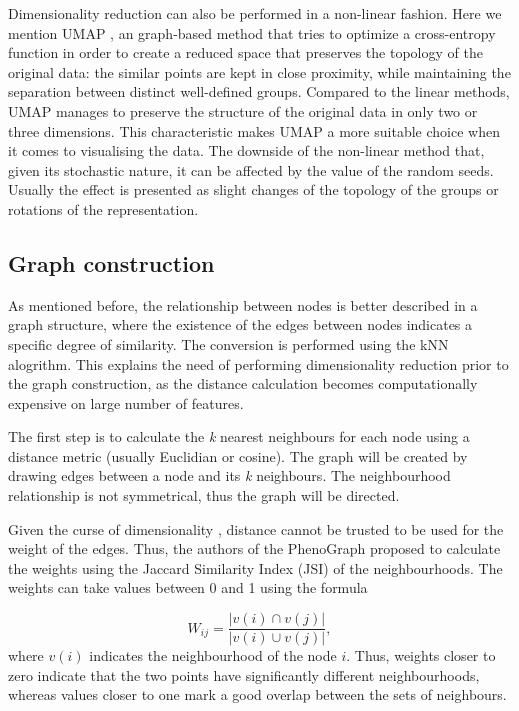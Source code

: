     Dimensionality reduction can also be performed in a non-linear fashion. Here we mention UMAP \cite{mcinnes2018uniform}, an graph-based method that tries to optimize a cross-entropy function in order to create a reduced space that preserves the topology of the original data: the similar points are kept in close proximity, while maintaining the separation between distinct well-defined groups. Compared to the linear methods, UMAP manages to preserve the structure of the original data in only two or three dimensions. This characteristic makes UMAP a more suitable choice when it comes to visualising the data. The downside of the non-linear method that, given its stochastic nature, it can be affected by the value of the random seeds. Usually the effect is presented as slight changes of the topology of the groups or rotations of the representation.

    \subsection{Graph construction}
    As mentioned before, the relationship between nodes is better described in a graph structure, where the existence of the edges between nodes indicates a specific degree of similarity. The conversion is performed using the kNN alogrithm. This explains the need of performing dimensionality reduction prior to the graph construction, as the distance calculation becomes computationally expensive on large number of features.
    
    The first step is to calculate the \textit{k} nearest neighbours for each node using a distance metric (usually Euclidian or cosine). The graph will be created by drawing edges between a node and its \textit{k} neighbours. The neighbourhood relationship is not symmetrical, thus the graph will be directed. 
    
    Given the curse of dimensionality \cite{Altman2018}, distance cannot be trusted to be used for the weight of the edges. Thus, the authors of the PhenoGraph proposed to calculate the weights using the Jaccard Similarity Index (JSI) of the neighbourhoods. The weights can take values between 0 and 1 using the formula 
    
    \[ W_{ij} = \frac{|v(i) \cap v(j)|}{|v(i) \cup v(j)|}, \] where $v(i)$ indicates the neighbourhood of the node $i$. Thus, weights closer to zero indicate that the two points have significantly different neighbourhoods, whereas values closer to one mark a good overlap between the sets of neighbours.
    
